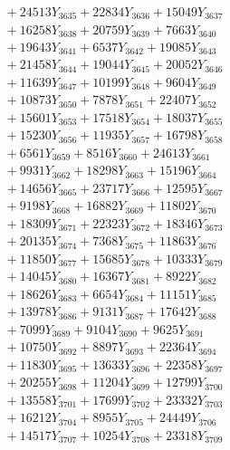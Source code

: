 \documentclass[a4paper,10pt]{article}
\begin{document}
{\begin{align}
&\;  + 24513 Y_{3635} + 22834 Y_{3636} + 15049 Y_{3637} \\[0.3ex]
&\;  + 16258 Y_{3638} + 20759 Y_{3639} + 7663 Y_{3640} \\[0.3ex]
&\;  + 19643 Y_{3641} + 6537 Y_{3642} + 19085 Y_{3643} \\[0.3ex]
&\;  + 21458 Y_{3644} + 19044 Y_{3645} + 20052 Y_{3646} \\[0.3ex]
&\;  + 11639 Y_{3647} + 10199 Y_{3648} + 9604 Y_{3649} \\[0.3ex]
&\;  + 10873 Y_{3650} + 7878 Y_{3651} + 22407 Y_{3652} \\[0.3ex]
&\;  + 15601 Y_{3653} + 17518 Y_{3654} + 18037 Y_{3655} \\[0.3ex]
&\;  + 15230 Y_{3656} + 11935 Y_{3657} + 16798 Y_{3658} \\[0.5ex]\allowbreak
&\;  + 6561 Y_{3659} + 8516 Y_{3660} + 24613 Y_{3661} \\[0.3ex]
&\;  + 9931 Y_{3662} + 18298 Y_{3663} + 15196 Y_{3664} \\[0.3ex]
&\;  + 14656 Y_{3665} + 23717 Y_{3666} + 12595 Y_{3667} \\[0.3ex]
&\;  + 9198 Y_{3668} + 16882 Y_{3669} + 11802 Y_{3670} \\[0.3ex]
&\;  + 18309 Y_{3671} + 22323 Y_{3672} + 18346 Y_{3673} \\[0.3ex]
&\;  + 20135 Y_{3674} + 7368 Y_{3675} + 11863 Y_{3676} \\[0.3ex]
&\;  + 11850 Y_{3677} + 15685 Y_{3678} + 10333 Y_{3679} \\[0.3ex]
&\;  + 14045 Y_{3680} + 16367 Y_{3681} + 8922 Y_{3682} \\[0.3ex]
&\;  + 18626 Y_{3683} + 6654 Y_{3684} + 11151 Y_{3685} \\[0.3ex]
&\;  + 13978 Y_{3686} + 9131 Y_{3687} + 17642 Y_{3688} \\[0.5ex]\allowbreak
&\;  + 7099 Y_{3689} + 9104 Y_{3690} + 9625 Y_{3691} \\[0.3ex]
&\;  + 10750 Y_{3692} + 8897 Y_{3693} + 22364 Y_{3694} \\[0.3ex]
&\;  + 11830 Y_{3695} + 13633 Y_{3696} + 22358 Y_{3697} \\[0.3ex]
&\;  + 20255 Y_{3698} + 11204 Y_{3699} + 12799 Y_{3700} \\[0.3ex]
&\;  + 13558 Y_{3701} + 17699 Y_{3702} + 23332 Y_{3703} \\[0.3ex]
&\;  + 16212 Y_{3704} + 8955 Y_{3705} + 24449 Y_{3706} \\[0.3ex]
&\;  + 14517 Y_{3707} + 10254 Y_{3708} + 23318 Y_{3709} \\[0.3ex]

\end{align}}
\end{document}
